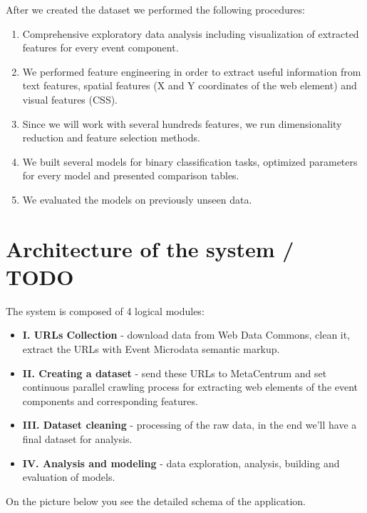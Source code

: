 After we created the dataset we performed the following procedures:
\begin{enumerate}
    \item Comprehensive exploratory data analysis including visualization of extracted features for every event component.
    \item We performed feature engineering in order to extract useful information from text features, spatial features (X and Y coordinates of the web element) and visual features (CSS). 
    \item Since we will work with several hundreds features, we run dimensionality reduction and feature selection methods. 
    \item We built several models for binary classification tasks, optimized parameters for every model and presented comparison tables.  
    \item We evaluated the models on previously unseen data.    
\end{enumerate}

\section{Architecture of the system / TODO}
\label{sec:arch}

The system is composed of 4 logical modules:

\begin{itemize}
    \item \textbf{I. URLs Collection} - download data from Web Data Commons, clean it, extract the URLs with Event Microdata semantic markup.
    \item \textbf{II. Creating a dataset} - send these URLs to MetaCentrum and set continuous parallel crawling process for extracting web elements of the event components and corresponding features.
    \item \textbf{III. Dataset cleaning} - processing of the raw data, in the end we'll have a final dataset for analysis.
    \item \textbf{IV. Analysis and modeling} - data exploration, analysis, building and evaluation of models.
\end{itemize}

On the picture below you see the detailed schema of the application. 

